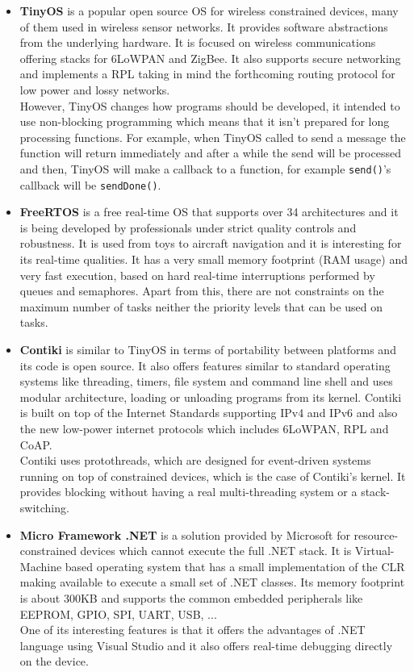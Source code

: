 \begin{itemize}
\item \textbf{TinyOS} is a popular open source OS for wireless constrained devices, many of them used in wireless sensor networks. It provides software abstractions from the underlying hardware. It is focused on wireless communications offering stacks for 6LoWPAN and ZigBee. It also supports secure networking and implements a \gls{RPL} taking in mind the forthcoming routing protocol for low power and lossy networks.
\\
However, TinyOS changes how programs should be developed, it intended to use non-blocking programming which means that it isn't prepared for long processing functions. For example, when TinyOS called to send a message the function will return immediately and after a while the send will be processed and then, TinyOS will make a callback to a function, for example \verb!send()!'s callback will be \verb!sendDone()!.

\item \textbf{FreeRTOS} is a free real-time OS that supports over 34 architectures and it is being developed by professionals under strict quality controls and robustness. It is used from toys to aircraft navigation and it is interesting for its real-time qualities. It has a very small memory footprint (RAM usage) and very fast execution, based on hard real-time interruptions performed by queues and semaphores. Apart from this, there are not constraints on the maximum number of tasks neither the priority levels that can be used on tasks. 

\item \textbf{Contiki} is similar to TinyOS in terms of portability between platforms and its code is open source. It also offers features similar to standard operating systems like threading, timers, file system and command line shell and uses modular architecture, loading or unloading programs from its kernel. Contiki is built on top of the Internet Standards supporting IPv4 and IPv6 and also the new low-power internet protocols which includes 6LoWPAN, RPL and CoAP.
\\
Contiki uses protothreads, which are designed for event-driven systems running on top of constrained devices, which is the case of Contiki's kernel. It provides blocking without having a real multi-threading system or a stack-switching.

\item \textbf{Micro Framework .NET} is a solution provided by Microsoft for resource-constrained devices which cannot execute the full .NET stack. It is Virtual-Machine based operating system that has a small implementation of the CLR making available to execute a small set of .NET classes. Its memory footprint is about 300KB and supports the common embedded peripherals like EEPROM, GPIO, SPI, UART, USB, ...
\\
One of its interesting features is that it offers the advantages of .NET language using Visual Studio and it also offers real-time debugging directly on the device.
\end{itemize}

